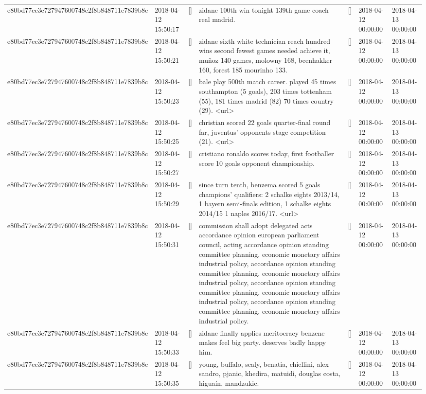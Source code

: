 \begin{tabular}{lllllll}
e80bd77ec3e727947600748c2f8b848711e7839b8c & 2018-04-12 15:50:17 & [] & zidane 100th win tonight 139th game coach real madrid. & [] & 2018-04-12 00:00:00 & 2018-04-13 00:00:00 \\
e80bd77ec3e727947600748c2f8b848711e7839b8c & 2018-04-12 15:50:21 & [] & zidane sixth white technician reach hundred wins second fewest games needed achieve it, muñoz 140 games, molowny 168, beenhakker 160, forest 185 mourinho 133. & [] & 2018-04-12 00:00:00 & 2018-04-13 00:00:00 \\
e80bd77ec3e727947600748c2f8b848711e7839b8c & 2018-04-12 15:50:23 & [] & bale play 500th match career. played 45 times southampton (5 goals), 203 times tottenham (55), 181 times madrid (82) 70 times country (29). <url> & [] & 2018-04-12 00:00:00 & 2018-04-13 00:00:00 \\
e80bd77ec3e727947600748c2f8b848711e7839b8c & 2018-04-12 15:50:25 & [] & christian scored 22 goals quarter-final round far, juventus' opponents stage competition (21). <url> & [] & 2018-04-12 00:00:00 & 2018-04-13 00:00:00 \\
e80bd77ec3e727947600748c2f8b848711e7839b8c & 2018-04-12 15:50:27 & [] & cristiano ronaldo scores today, first footballer score 10 goals opponent championship. & [] & 2018-04-12 00:00:00 & 2018-04-13 00:00:00 \\
e80bd77ec3e727947600748c2f8b848711e7839b8c & 2018-04-12 15:50:29 & [] & since turn tenth, benzema scored 5 goals champions' qualifiers: 2 schalke eights 2013/14, 1 bayern semi-finals edition, 1 schalke eights 2014/15 1 naples 2016/17. <url> & [] & 2018-04-12 00:00:00 & 2018-04-13 00:00:00 \\
e80bd77ec3e727947600748c2f8b848711e7839b8c & 2018-04-12 15:50:31 & [] & commission shall adopt delegated acts accordance opinion european parliament council, acting accordance opinion standing committee planning, economic monetary affairs industrial policy, accordance opinion standing committee planning, economic monetary affairs industrial policy, accordance opinion standing committee planning, economic monetary affairs industrial policy, accordance opinion standing committee planning, economic monetary affairs industrial policy. & [] & 2018-04-12 00:00:00 & 2018-04-13 00:00:00 \\
e80bd77ec3e727947600748c2f8b848711e7839b8c & 2018-04-12 15:50:33 & [] & zidane finally applies meritocracy benzene makes feel big party. deserves badly happy him. & [] & 2018-04-12 00:00:00 & 2018-04-13 00:00:00 \\
e80bd77ec3e727947600748c2f8b848711e7839b8c & 2018-04-12 15:50:35 & [] & young, buffalo, scaly, benatia, chiellini, alex sandro, pjanic, khedira, matuidi, douglas costa, higuaín, mandzukic. & [] & 2018-04-12 00:00:00 & 2018-04-13 00:00:00 \\

\end{tabular}
